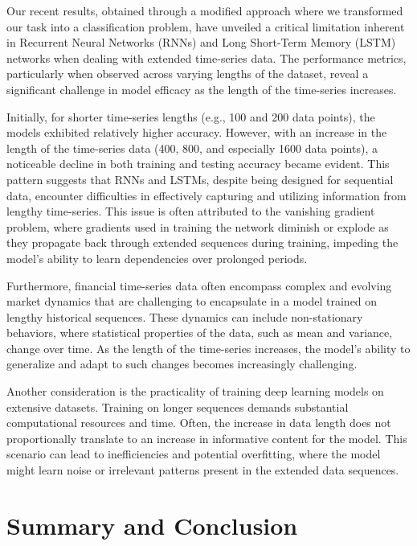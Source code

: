 \documentclass[10pt,twocolumn,letterpaper]{article}
\begin{document}
Our recent results, obtained through a modified approach where we transformed our task into a classification problem, have unveiled a critical limitation inherent in Recurrent Neural Networks (RNNs) and Long Short-Term Memory (LSTM) networks when dealing with extended time-series data. The performance metrics, particularly when observed across varying lengths of the dataset, reveal a significant challenge in model efficacy as the length of the time-series increases.

Initially, for shorter time-series lengths (e.g., 100 and 200 data points), the models exhibited relatively higher accuracy. However, with an increase in the length of the time-series data (400, 800, and especially 1600 data points), a noticeable decline in both training and testing accuracy became evident. This pattern suggests that RNNs and LSTMs, despite being designed for sequential data, encounter difficulties in effectively capturing and utilizing information from lengthy time-series. This issue is often attributed to the vanishing gradient problem, where gradients used in training the network diminish or explode as they propagate back through extended sequences during training, impeding the model's ability to learn dependencies over prolonged periods.

Furthermore, financial time-series data often encompass complex and evolving market dynamics that are challenging to encapsulate in a model trained on lengthy historical sequences. These dynamics can include non-stationary behaviors, where statistical properties of the data, such as mean and variance, change over time. As the length of the time-series increases, the model's ability to generalize and adapt to such changes becomes increasingly challenging.

Another consideration is the practicality of training deep learning models on extensive datasets. Training on longer sequences demands substantial computational resources and time. Often, the increase in data length does not proportionally translate to an increase in informative content for the model. This scenario can lead to inefficiencies and potential overfitting, where the model might learn noise or irrelevant patterns present in the extended data sequences.

\section{Summary and Conclusion} \label{sec:summary}
\end{document}
